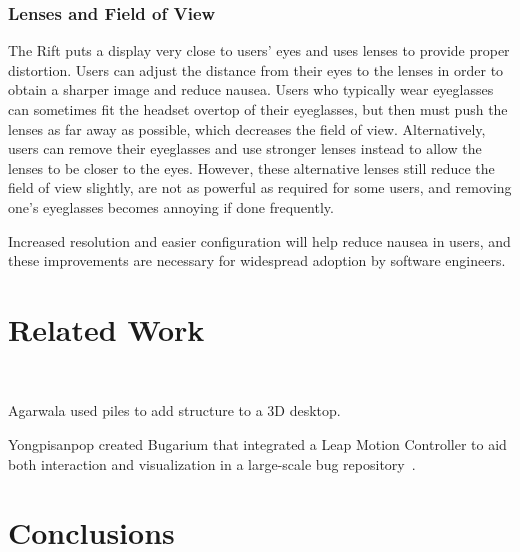 \documentclass[conference]{IEEEtran}
\begin{document}
\subsubsection{Lenses and Field of View}
The Rift puts a display very close to users' eyes and uses lenses to provide proper distortion.
Users can adjust the distance from their eyes to the lenses in order to obtain a sharper image and reduce nausea.
Users who typically wear eyeglasses can sometimes fit the headset overtop of their eyeglasses, but then must push the lenses as far away as possible, which decreases the field of view.
Alternatively, users can remove their eyeglasses and use stronger lenses instead to allow the lenses to be closer to the eyes.
However, these alternative lenses still reduce the field of view slightly, are not as powerful as required for some users, and removing one's eyeglasses becomes annoying if done frequently.

Increased resolution and easier configuration will help reduce nausea in users, and these improvements are necessary for widespread adoption by software engineers.



\section{Related Work}

\\



Agarwala used piles to add structure to a 3D desktop.~\cite{Agarawala:BumpTop}

Yongpisanpop created Bugarium that integrated a Leap Motion Controller to aid both interaction and visualization in a large-scale bug repository~\cite{Bugarium}.



\section{Conclusions}
\end{document}
